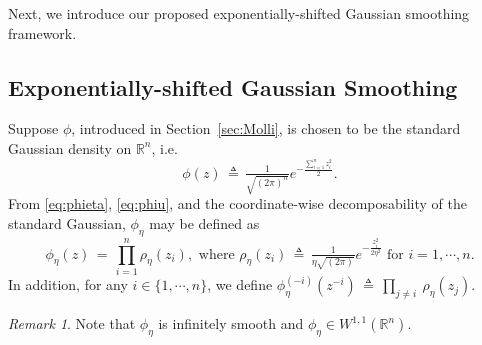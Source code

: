 \documentclass[11pt,reqno]{amsart}
\newcommand{\1}{{\bf 1}}
\newcommand{\2}{{\bf 2}}
\newcommand{\R}{\mathbb R}
\numberwithin{equation}{section}
\theoremstyle{remark}
\newtheorem{remark}{Remark}[section]
\begin{document}
		\medskip
		
		Next, we introduce our proposed exponentially-shifted Gaussian smoothing framework.
		
		\subsection{Exponentially-shifted Gaussian Smoothing}\label{sec:smoothedgrad}
		
		Suppose $\phi$, introduced in Section~\ref{sec:Molli}, is chosen to be the standard Gaussian density on $\mathbb{R}^n$, i.e. 
		\begin{equation}\label{eq:phiu}
			\phi(z)  \, \triangleq \,  \tfrac{1}{\sqrt{(2\pi)^n}} e^{-\frac{ \sum_{i=1}^n z_i^2}{2}}.
		\end{equation}
		From \eqref{eq:phieta}, \eqref{eq:phiu}, and the coordinate-wise decomposability of the standard Gaussian, $\phi_{\eta}$ may be defined as
		\begin{equation}\label{eq:phietau}
			\phi_{\eta}(z) \, = \,  \prod_{i=1}^n \rho_\eta(z_i), \mbox{ where } \rho_\eta(z_i) \, \triangleq \, \tfrac{1}{\eta\sqrt{(2\pi)}} e^{-\tfrac{z_i^2}{2\eta^2}} \mbox{ for } i = 1, \cdots, n.
		\end{equation}
		In addition, for any $i \in \{1, \cdots, n\}$, we define $\phi_{\eta}^{(-i)}(z^{-i}) \, \triangleq \,  \displaystyle \prod_{j \ne i}\ \rho_\eta(z_j).$ 
		\begin{remark}\label{rk:phidrvbd}
			Note that $\phi_\eta$ is infinitely smooth and  $\phi_{\eta} \in W^{1,1}(\R^n)$. 
		\end{remark}
		
\end{document}
